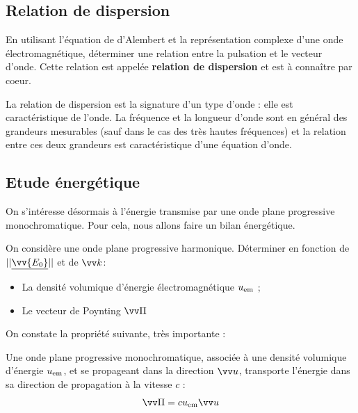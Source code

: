 \documentclass[11pt,fleqn]{book} %
\begin{document}
\subsection{Relation de dispersion}

\begin{capex}
	En utilisant l'équation de d'Alembert et la représentation complexe d'une onde électromagnétique, déterminer une relation entre la pulsation et le vecteur d'onde. Cette relation est appelée \textbf{relation de dispersion} et est à connaître par coeur.
\end{capex}

La relation de dispersion est la signature d'un type d'onde : elle est caractéristique de l'onde. La fréquence et la longueur d'onde sont en général des grandeurs mesurables (sauf dans le cas des très hautes fréquences) et la relation entre ces deux grandeurs est caractéristique d'une équation d'onde.

\subsection{Etude énergétique}

On s'intéresse désormais à l'énergie transmise par une onde plane progressive monochromatique. Pour cela, nous allons faire un bilan énergétique.

\begin{capex}
	On considère une onde plane progressive harmonique. Déterminer en fonction de $||\underline{\vv{E_0}}||$ et de $\vv k$:
	\begin{itemize}
		\item La densité volumique d'énergie électromagnétique $u_{\rm em}$ ;
		\item Le vecteur de Poynting $\vv \Pi$
	\end{itemize}
\end{capex}

On constate la propriété suivante, très importante :
\begin{proposition}
	Une onde plane progressive monochromatique, associée à une densité volumique d'énergie $u_{\rm em}$, et se propageant dans la direction $\vv u$, transporte l'énergie dans sa direction de propagation à la vitesse $c$ :
	\begin{equation}
		\vv \Pi = c u_{\rm em} \vv u
	\end{equation}
\end{proposition}
\end{document}
